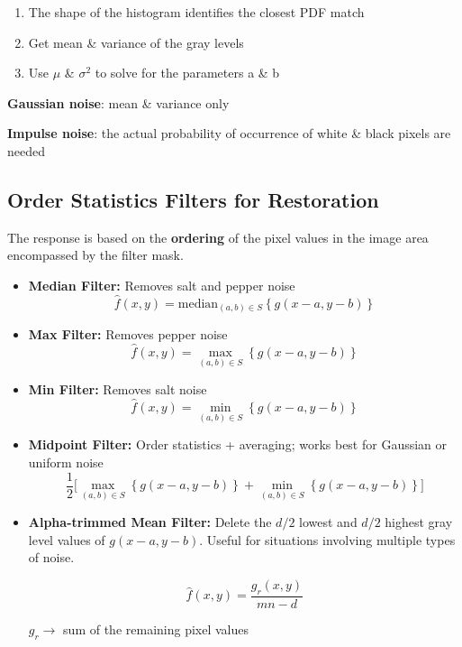 \begin{enumerate}
  \item The shape of the histogram identifies the closest PDF match
  \item Get mean \& variance of the gray levels
  \item Use $\mu$ \& $\sigma^2$ to solve for the parameters a \& b
\end{enumerate}

\textbf{Gaussian noise}: mean \& variance only

\textbf{Impulse noise}: the actual probability of occurrence of white
\& black pixels are needed

\subsection*{Order Statistics Filters for Restoration}

The response is based on the \textbf{ordering} of the pixel values in
the image area encompassed by the filter mask.

\begin{itemize}
  \item \textbf{Median Filter:} Removes salt and pepper noise
    \begin{equation*}
      \hat{f}(x, y) = \text{median}_{(a, b) \in S} \left\{ g(x - a, y
      - b) \right\}
    \end{equation*}

  \item \textbf{Max Filter:} Removes pepper noise
    \begin{equation*}
      \hat{f}(x, y) = \max_{(a, b) \in S} \left\{ g(x - a, y - b) \right\}
    \end{equation*}

  \item \textbf{Min Filter:} Removes salt noise
    \begin{equation*}
      \hat{f}(x, y) = \min_{(a, b) \in S} \left\{ g(x - a, y - b) \right\}
    \end{equation*}

  \item \textbf{Midpoint Filter:} Order statistics + averaging; works
    best for Gaussian or uniform noise
    \vspace{-0.1em}
    \begin{equation*}
      \frac{1}{2} \bigg[ \max_{(a, b) \in S} \left\{
        g(x - a, y - b) \right\} + \min_{(a, b) \in S} \left\{ g(x - a,
      y - b) \right\} \bigg]
    \end{equation*}

  \item \textbf{Alpha-trimmed Mean Filter:} Delete the $d/2$ lowest
    and $d/2$ highest gray level values of $g(x - a, y - b)$. Useful
    for situations involving multiple types of noise.

    \begin{equation*}
      \hat{f}(x, y) = \frac{g_r(x, y)}{mn - d}
    \end{equation*}

    $g_r \rightarrow$ sum of the remaining pixel values
\end{itemize}

